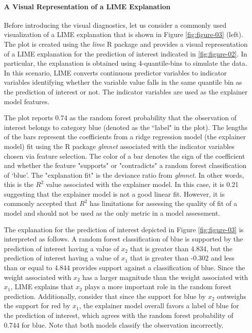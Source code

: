 \documentclass[AMS,STIX2COL]{WileyNJD-v2}\usepackage[]{graphicx}\usepackage[]{color}
\begin{document}
\paragraph{A Visual Representation of a LIME Explanation}

Before introducing the visual diagnostics, let us consider a commonly used visualization of a LIME explanation that is shown in Figure \ref{fig:figure-03} (left). The plot is created using the \emph{lime} R package and provides a visual representation of a LIME explanation for the prediction of interest indicated in \autoref{fig:figure-02}. In particular, the explanation is obtained using 4-quantile-bins to simulate the data. In this scenario, LIME converts continuous predictor variables to indicator variables identifying whether the variable value falls in the same quantile bin as the prediction of interest or not. The indicator variables are used as the explainer model features.  

The plot reports 0.74 as  the random forest  probability  that the observation of interest belongs to category blue (denoted as the ``label" in the plot). The lengths of the bars represent the  coefficients from a ridge regression model (the explainer model) fit using the R package \emph{glmnet} \citep{simon:2011} associated with the indicator variables chosen via feature selection. The color of a  bar denotes the sign of the coefficient and whether the feature "supports" or "contradicts" a random forest classification of `blue'. The "explanation fit" is the deviance ratio from  \emph{glmnet}. In other words, this is the $R^2$ value associated with the explainer model. In this case, it is 0.21 suggesting that the explainer model is not a good linear fit. However, it is commonly accepted that $R^2$ has limitations for assessing the quality of fit of a model \citep{sapra:2014} and  should not be used as the only metric in a model assessment.

The explanation for the prediction of interest depicted in Figure \ref{fig:figure-03} is interpreted as follows. A random forest classification of blue is supported by the prediction of interest having a value of $x_2$ that is greater than 4.834, but the prediction of interest having a value of $x_1$ that is greater than -0.302 and less than or equal to 4.844 provides support against a classification of blue. Since the weight associated with $x_2$ has a larger magnitude than the weight associated with $x_1$, LIME explains that $x_2$ plays a more important role in the random forest prediction. Additionally, consider that since the support for blue by $x_2$ outweighs the support for red by $x_1$, the explainer model overall favors a label of blue for the prediction of interest, which agrees with the random forest probability of 0.744 for blue. Note that both models classify the observation incorrectly.
\end{document}
